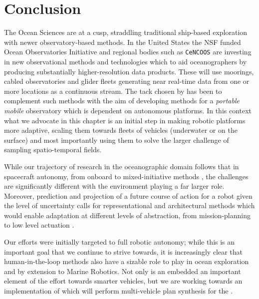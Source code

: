 \section{Conclusion}
\label{sec:conclusion}


The Ocean Sciences are at a cusp, straddling traditional ship-based
exploration with newer observatory-based methods. In the United States
the NSF funded Ocean Observatories Initiative \cite{ooi} and regional
bodies such as \texttt{CeNCOOS} \cite{cencoos} are investing in new
observational methods and technologies which  to aid
oceanographers by producing substantially higher-resolution data
products. These will use moorings, cabled observatories and glider
fleets generating near real-time data from one or more locations as a
continuous stream. The tack chosen by \can has been to complement such
methods with the aim of developing methods for a \emph{portable
  mobile} observatory which is dependent on autonomous platforms. In
this context what we advocate in this chapter is an initial step in
making robotic platforms more adaptive, scaling them towards fleets of
vehicles (underwater or on the surface) and most
importantly using them to solve the larger challenge of sampling
 spatio-temporal fields.

While our trajectory of research in the oceanographic domain follows
that in spacecraft autonomy, from onboard \cite{mus98} to
mixed-initiative methods \cite{bresina05}, the challenges are
significantly different with the environment playing a far larger
role. Moreover, prediction and projection of a future course of action
for a robot given the level of uncertainty calls for representational
and architectural methods which would enable adaptation at different
levels of abstraction, from mission-planning to low level actuation
.

Our efforts were initially targeted to full robotic autonomy; while
this is an important goal that we continue to strive towards, it is
increasingly clear that human-in-the-loop methods also have a sizable
role to play in ocean exploration and by extension to  Marine Robotics. Not only is an embedded
 an important element of the effort
towards smarter vehicles, but we are working towards an implementation
of \rx which will perform multi-vehicle plan synthesis for the \ode.

